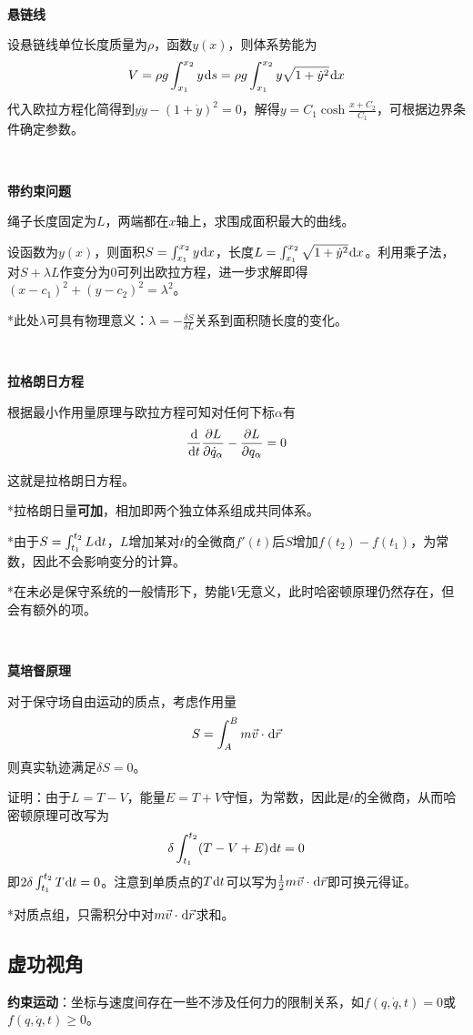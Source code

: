 \documentclass[a4paper,UTF8,fontset=windows]{ctexart}
\newcommand*{\dr}{\hspace{0.07em}\mathrm{d}}
\begin{document}
\

\textbf{悬链线}

设悬链线单位长度质量为$\rho$，函数$y(x)$，则体系势能为
$$V=\rho g\int_{x_1}^{x_2}y\dr s=\rho g\int_{x_1}^{x_2}y\sqrt{1+\dot{y}^2}\dr x$$
代入欧拉方程化简得到$y\ddot{y}-(1+\dot{y})^2=0$，解得$y=C_1\cosh\frac{x+C_2}{C_1}$，可根据边界条件确定参数。

\

\textbf{带约束问题}

绳子长度固定为$L$，两端都在$x$轴上，求围成面积最大的曲线。

设函数为$y(x)$，则面积$S=\int_{x_1}^{x_2}y\dr x$，长度$L=\int_{x_1}^{x_2}\sqrt{1+\dot{y}^2}\dr x$。利用乘子法，对$S+\lambda L$作变分为0可列出欧拉方程，进一步求解即得$(x-c_1)^2+(y-c_2)^2=\lambda^2$。

*此处$\lambda$可具有物理意义：$\lambda=-\frac{\delta S}{\delta L}$关系到面积随长度的变化。

\

\textbf{拉格朗日方程}

根据最小作用量原理与欧拉方程可知对任何下标$\alpha$有
$$\frac{\dr}{\dr t}\frac{\partial L}{\partial\dot{q}_\alpha}-\frac{\partial L}{\partial q_\alpha}=0$$

这就是拉格朗日方程。

*拉格朗日量\textbf{可加}，相加即两个独立体系组成共同体系。

*由于$S=\int_{t_1}^{t_2}L\dr t$，$L$增加某对$t$的全微商$f'(t)$后$S$增加$f(t_2)-f(t_1)$，为常数，因此不会影响变分的计算。

*在未必是保守系统的一般情形下，势能$V$无意义，此时哈密顿原理仍然存在，但会有额外的项。

\

\textbf{莫培督原理}

对于保守场自由运动的质点，考虑作用量
$$S=\int_A^Bm\vec{v}\cdot\dr\vec{r}$$
则真实轨迹满足$\delta S=0$。

证明：由于$L=T-V$，能量$E=T+V$守恒，为常数，因此是$t$的全微商，从而哈密顿原理可改写为
$$\delta\int_{t_1}^{t_2}(T-V+E)\dr t=0$$
即$2\delta\int_{t_1}^{t_2}T\dr t=0$。注意到单质点的$T\dr t$可以写为$\frac{1}{2}m\vec{v}\cdot\dr{\vec{r}}$即可换元得证。

*对质点组，只需积分中对$m\vec{v}\cdot\dr\vec{r}$求和。

\subsection{虚功视角}
\textbf{约束运动}：坐标与速度间存在一些不涉及任何力的限制关系，如$f(q,\dot{q},t)=0$或$f(q,\dot{q},t)\ge0$。
\end{document}
